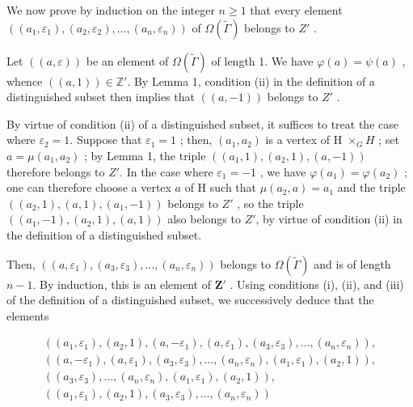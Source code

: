 We now prove by induction on the integer \(n \geqslant 1\) that every element \(((a_1, \varepsilon_1), (a_2, \varepsilon_2), \ldots, (a_n, \varepsilon_n))\) of \(\Omega(\widetilde{\Gamma})\) belongs to \(Z'\) .


Let \(((a,\varepsilon))\) be an element of \(\Omega(\tilde{\Gamma})\) of length 1. We have \(\varphi(a)=\psi(a)\) , whence \(((a,1))\in\mathbb{Z}'\). By Lemma 1, condition (ii) in the definition of a distinguished subset then implies that \(((a,-1))\) belongs to \(Z'\) .


By virtue of condition (ii) of a distinguished subset, it suffices to treat the case where \(\varepsilon_{2}=1\). Suppose that \(\varepsilon_{1}=1\) ; then, \((a_{1},a_{2})\) is a vertex of H \(\times_{G}H\) ; set \(a=\mu(a_{1},a_{2})\) ; by Lemma 1, the triple \(((a_{1},1),(a_{2},1),(a,-1))\) therefore belongs to \(Z'\). In the case where \(\varepsilon_{1}=-1\) , we have \(\varphi(a_{1})=\varphi(a_{2})\) ; one can therefore choose a vertex \(a\) of H such that \(\mu(a_{2},a)=a_{1}\) and the triple \(((a_{2},1),(a,1),(a_{1},-1))\) belongs to \(Z'\) , so the triple \(((a_{1},-1),(a_{2},1),(a,1))\) also belongs to \(Z'\), by virtue of condition (ii) in the definition of a distinguished subset.

Then, \(((a,\varepsilon_1),(a_3,\varepsilon_3),\ldots ,(a_n,\varepsilon_n))\) belongs to \(\Omega (\widetilde{\Gamma})\) and is of length \(n - 1\). By induction, this is an element of \(\mathbf{Z}'\) . Using conditions (i), (ii), and (iii) of the definition of a distinguished subset, we successively deduce that the elements

\[
\begin{array}{c} ((a _ {1}, \varepsilon_ {1}), (a _ {2}, 1), (a, - \varepsilon_ {1}), (a, \varepsilon_ {1}), (a _ {3}, \varepsilon_ {3}), \ldots , (a _ {n}, \varepsilon_ {n})), \\ ((a, - \varepsilon_ {1}), (a, \varepsilon_ {1}), (a _ {3}, \varepsilon_ {3}), \ldots , (a _ {n}, \varepsilon_ {n}), (a _ {1}, \varepsilon_ {1}), (a _ {2}, 1)), \\ ((a _ {3}, \varepsilon_ {3}), \ldots , (a _ {n}, \varepsilon_ {n}), (a _ {1}, \varepsilon_ {1}), (a _ {2}, 1)), \\ ((a _ {1}, \varepsilon_ {1}), (a _ {2}, 1), (a _ {3}, \varepsilon_ {3}), \ldots , (a _ {n}, \varepsilon_ {n})) \end{array}
\]

